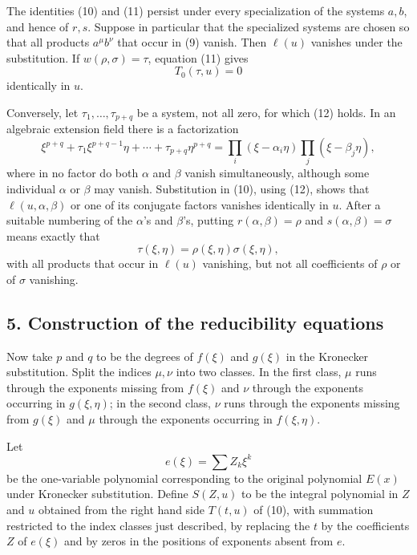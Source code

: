 \documentclass[11pt]{article}
\begin{document}
The identities (10) and (11) persist under every specialization of the systems $a,b$, and hence of $r,s$. Suppose in particular that the specialized systems are chosen so that all products $a^\mu b^\nu$ that occur in (9) vanish. Then $\ell(u)$ vanishes under the substitution. If $w(\rho,\sigma)=\tau$, equation (11) gives
\begin{equation}
  T_0(\tau,u)=0                                                    \tag{12}
\end{equation}
identically in $u$.

Conversely, let $\tau_1,\ldots,\tau_{p+q}$ be a system, not all zero, for which (12) holds. In an algebraic extension field there is a factorization
\[
  \xi^{p+q}+\tau_1\xi^{p+q-1}\eta+\cdots+\tau_{p+q}\eta^{p+q}
  =\prod_i(\xi-\alpha_i\eta)\prod_j(\xi-\beta_j\eta),
\]
where in no factor do both $\alpha$ and $\beta$ vanish simultaneously, although some individual $\alpha$ or $\beta$ may vanish. Substitution in (10), using (12), shows that $\ell(u,\alpha,\beta)$ or one of its conjugate factors vanishes identically in $u$. After a suitable numbering of the $\alpha$'s and $\beta$'s, putting $r(\alpha,\beta)=\rho$ and $s(\alpha,\beta)=\sigma$ means exactly that
\begin{equation}
  \tau(\xi,\eta)=\rho(\xi,\eta)\sigma(\xi,\eta),                    \tag{13}
\end{equation}
with all products that occur in $\ell(u)$ vanishing, but not all coefficients of $\rho$ or of $\sigma$ vanishing.

\subsection*{5. Construction of the reducibility equations}

Now take $p$ and $q$ to be the degrees of $f(\xi)$ and $g(\xi)$ in the Kronecker substitution. Split the indices $\mu,\nu$ into two classes. In the first class, $\mu$ runs through the exponents missing from $f(\xi)$ and $\nu$ through the exponents occurring in $g(\xi,\eta)$; in the second class, $\nu$ runs through the exponents missing from $g(\xi)$ and $\mu$ through the exponents occurring in $f(\xi,\eta)$.

Let
\[
  e(\xi)=\sum Z_k\xi^k
\]
be the one-variable polynomial corresponding to the original polynomial $E(x)$ under Kronecker substitution. Define $S(Z,u)$ to be the integral polynomial in $Z$ and $u$ obtained from the right hand side $T(t,u)$ of (10), with summation restricted to the index classes just described, by replacing the $t$ by the coefficients $Z$ of $e(\xi)$ and by zeros in the positions of exponents absent from $e$.
\end{document}
